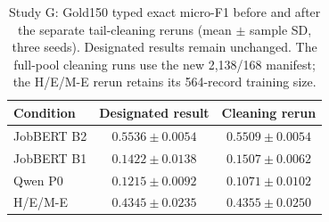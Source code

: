 \begin{table}[htbp]
\caption{Study G: Gold150 typed exact micro-F1 before and after the separate tail-cleaning reruns (mean $\pm$ sample SD, three seeds). Designated results remain unchanged. The full-pool cleaning runs use the new 2,138/168 manifest; the H/E/M-E rerun retains its 564-record training size.}
\label{tab:appendix-g-peel}
\centering
\small
\begin{tabularx}{\linewidth}{@{}Lcc@{}}
\toprule
Condition & Designated result & Cleaning rerun \\
\midrule
JobBERT B2 & $0.5536\pm0.0054$ & $0.5509\pm0.0054$ \\
JobBERT B1 & $0.1422\pm0.0138$ & $0.1507\pm0.0062$ \\
Qwen P0 & $0.1215\pm0.0092$ & $0.1071\pm0.0102$ \\
H/E/M-E & $0.4345\pm0.0235$ & $0.4355\pm0.0250$ \\
\bottomrule
\end{tabularx}
\end{table}
